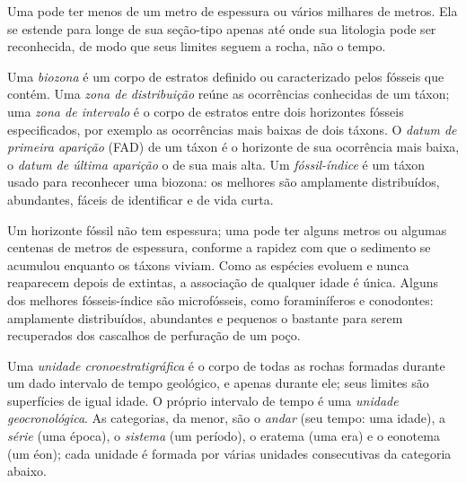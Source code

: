 Uma  pode ter menos de um metro de espessura ou vários milhares de metros. Ela se
estende para longe de sua seção-tipo apenas até onde sua litologia pode ser reconhecida, de
modo que seus limites seguem a rocha, não o tempo.

\begin{definition}\label{def:b1:stratigraphic-scale:biozone}
Uma \emph{biozona} é um corpo de estratos definido ou caracterizado pelos
fósseis que contém. Uma \emph{zona de distribuição} reúne as
ocorrências conhecidas de um táxon; uma \emph{zona de intervalo} é o
corpo de estratos entre dois horizontes fósseis especificados, por exemplo as ocorrências mais
baixas de dois táxons. O \emph{datum de primeira aparição}
(FAD) de um táxon é o horizonte de sua ocorrência mais baixa, o \emph{datum de última
aparição} o de sua mais alta. Um \emph{fóssil-índice}
é um táxon usado para reconhecer uma biozona: os melhores são amplamente distribuídos,
abundantes, fáceis de identificar e de vida curta.
\end{definition}

Um horizonte fóssil não tem espessura; uma  pode ter alguns metros ou algumas centenas
de metros de espessura, conforme a rapidez com que o sedimento se acumulou enquanto os táxons
viviam. Como as espécies evoluem e nunca reaparecem depois de extintas, a associação de
qualquer idade é única. Alguns dos melhores fósseis-índice são microfósseis, como
foraminíferos e conodontes: amplamente distribuídos, abundantes e pequenos o bastante para
serem recuperados dos cascalhos de perfuração de um poço.

\begin{definition}\label{def:b1:stratigraphic-scale:chronostratigraphy}
Uma \emph{unidade cronoestratigráfica} é o corpo de todas as
rochas formadas durante um dado intervalo de tempo geológico, e apenas durante ele; seus
limites são superfícies de igual idade. O próprio intervalo de tempo é uma \emph{unidade
geocronológica}. As categorias, da menor, são o
\emph{andar} (seu tempo: uma idade), a
\emph{série} (uma época), o \emph{sistema} (um período), o eratema (uma era) e o eonotema (um éon); cada unidade é
formada por várias unidades consecutivas da categoria abaixo.
\end{definition}


